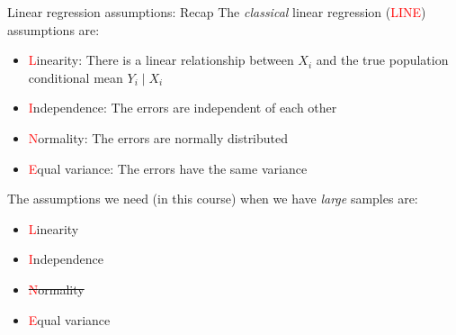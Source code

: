 \documentclass[10pt,t]{beamer}
\begin{document}
\begin{frame}{Linear regression assumptions: Recap}
The \textit{classical} linear regression (\textcolor{red}{LINE}) assumptions are:

\vspace{0.3cm}

\begin{itemize}
	\item \textcolor{red}{L}inearity: There is a linear relationship between $X_i$ and the true population conditional mean $Y_i \mid X_i$
	\item \textcolor{red}{I}ndependence: The errors are independent of each other
	\item \textcolor{red}{N}ormality: The errors are normally distributed
	\item \textcolor{red}{E}qual variance: The errors have the same variance
\end{itemize}

\vspace{0.3cm}

The assumptions we need (in this course) when we have \textit{large} samples are:

\vspace{0.3cm}

\begin{itemize}
	\item \textcolor{red}{L}inearity
	\item \textcolor{red}{I}ndependence
	\item \sout{\textcolor{red}{N}ormality}
	\item \textcolor{red}{E}qual variance
\end{itemize}

\end{frame}
\end{document}
